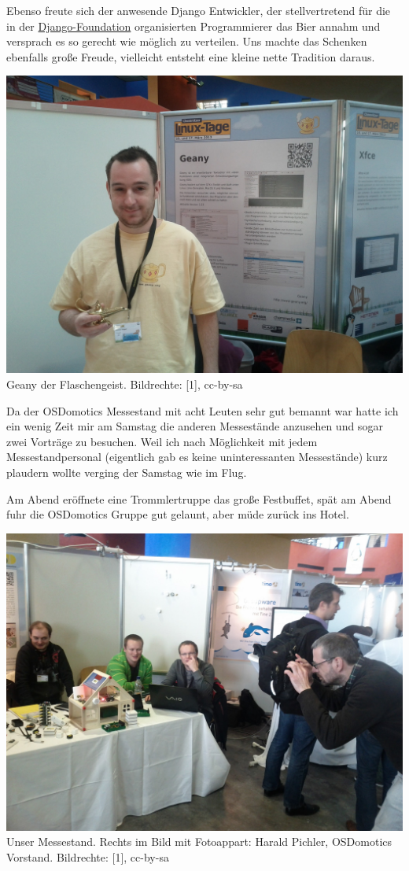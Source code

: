 Ebenso freute sich der anwesende Django Entwickler, der stellvertretend für die in der \href{https://www.djangoproject.com/foundation/}{Django-Foundation} organisierten  Programmierer das Bier annahm und versprach es so gerecht wie möglich zu verteilen. Uns machte das Schenken ebenfalls große Freude, vielleicht entsteht eine kleine nette Tradition daraus.
\begin{center}
\includegraphics[width=\linewidth]{chemnitz_geany2.jpg}
\footnotesize{Geany der Flaschengeist. Bildrechte: [1], cc-by-sa}
\end{center}
Da der OSDomotics Messestand mit acht Leuten sehr gut bemannt war hatte ich ein wenig Zeit mir am Samstag die anderen Messestände anzusehen und sogar zwei Vorträge zu besuchen. Weil ich nach Möglichkeit mit jedem Messestandpersonal (eigentlich gab es keine uninteressanten Messestände) kurz plaudern wollte verging der Samstag wie im Flug. 

Am Abend eröffnete eine Trommlertruppe das große Festbuffet, spät am Abend fuhr die OSDomotics Gruppe gut gelaunt, aber müde zurück ins Hotel.

\begin{center}
\includegraphics[width=\linewidth]{chemnitz_puppenhaus.jpg}
\footnotesize{Unser Messestand. Rechts im Bild mit Fotoappart: Harald Pichler, OSDomotics Vorstand. Bildrechte: [1],  cc-by-sa}
\end{center}

